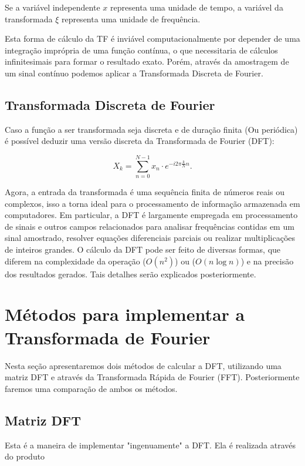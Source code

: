 \documentclass[brazil,times]{abnt}
\begin{document}
		Se a variável independente $x$ representa uma unidade de tempo, a variável da transformada $\xi$ representa uma unidade de frequência. 
		
		Esta forma de cálculo da TF é inviável computacionalmente por depender de uma integração imprópria de uma função contínua, o que necessitaria de cálculos infinitesimais para formar o resultado exato. Porém, através da amostragem de um sinal contínuo podemos aplicar a Transformada Discreta de Fourier.

	\section{Transformada Discreta de Fourier}
		Caso a função a ser transformada seja discreta e de duração finita (Ou periódica) é possível deduzir uma versão discreta da Transformada de Fourier (DFT):

		$$X_k = \sum_{n=0}^{N-1} x_n \cdot e^{-i 2 \pi \frac{k}{N} n}.$$

		Agora, a entrada da transformada é uma sequência finita de números reais ou complexos, isso a torna ideal para o processamento de informação armazenada em computadores. Em particular, a DFT é largamente empregada em processamento de sinais e outros campos relacionados para analisar frequências contidas em um sinal amostrado, resolver equações diferenciais parciais ou realizar multiplicações de inteiros grandes. O cálculo da DFT pode ser feito de diversas formas, que diferem na complexidade da operação ($O(n^2)$) ou ($O(n \log{n})$) e na precisão dos resultados gerados. Tais detalhes serão explicados posteriormente.



\chapter{Métodos para implementar a Transformada de Fourier}
	Nesta seção apresentaremos dois métodos de calcular a DFT, utilizando uma matriz DFT e através da Transformada Rápida de Fourier (FFT). Posteriormente faremos uma comparação de ambos os métodos.
	
	\section{Matriz DFT}
		Esta é a maneira de implementar "ingenuamente" a DFT. Ela é realizada através do produto
\end{document}
